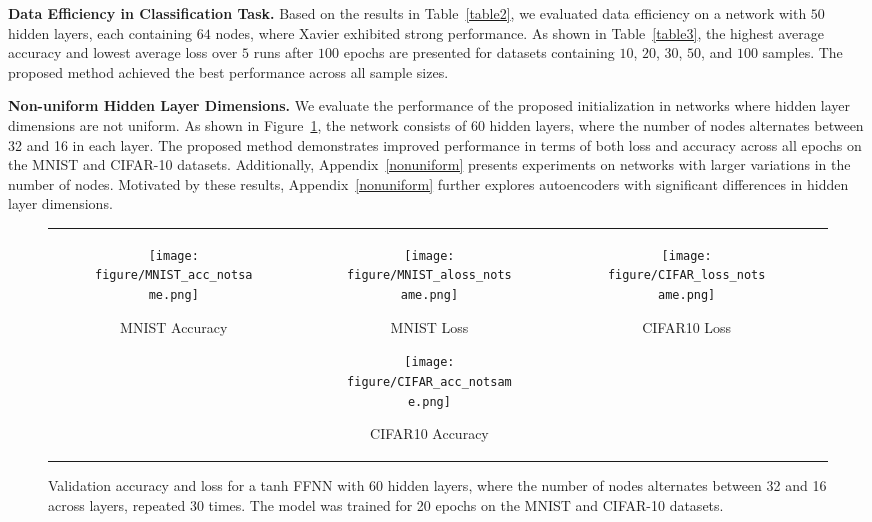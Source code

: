 \documentclass{article} \usepackage{iclr2025_conference,times}
\begin{document}
\textbf{Data Efficiency in Classification Task.} 
Based on the results in Table~\ref{table2}, we evaluated data efficiency on a network with $50$ hidden layers, each containing $64$ nodes, where Xavier exhibited strong performance. 
As shown in Table~\ref{table3}, the highest average accuracy and lowest average loss over $5$ runs after $100$ epochs are presented for datasets containing $10$, $20$, $30$, $50$, and $100$ samples. The proposed method achieved the best performance across all sample sizes.

\textbf{Non-uniform Hidden Layer Dimensions.} We evaluate the performance of the proposed initialization in networks where hidden layer dimensions are not uniform. As shown in Figure~\ref{fig:mnist_cifar}, the network consists of 60 hidden layers, where the number of nodes alternates between 32 and 16 in each layer. The proposed method demonstrates improved performance in terms of both loss and accuracy across all epochs on the MNIST and CIFAR-10 datasets. Additionally, Appendix~\ref{nonuniform} presents experiments on networks with larger variations in the number of nodes. Motivated by these results, Appendix~\ref{nonuniform} further explores autoencoders with significant differences in hidden layer dimensions.


\begin{figure}[h]
\centering 
\begin{tabular}{cccc}
\begin{subfigure}[b]{0.23\textwidth}
    \centering
    \texttt{[image: figure/MNIST\_acc\_notsame.png]}
    \caption{MNIST Accuracy}
\end{subfigure} &
\begin{subfigure}[b]{0.23\textwidth}
    \centering
    \texttt{[image: figure/MNIST\_aloss\_notsame.png]}
    \caption{MNIST Loss}
\end{subfigure} 
\begin{subfigure}[b]{0.23\textwidth}
    \centering
    \texttt{[image: figure/CIFAR\_acc\_notsame.png]}
    \caption{CIFAR10 Accuracy}
\end{subfigure} &
\begin{subfigure}[b]{0.23\textwidth}
    \centering
    \texttt{[image: figure/CIFAR\_loss\_notsame.png]}
    \caption{CIFAR10 Loss}
\end{subfigure} 
\end{tabular}
\caption{Validation accuracy and loss for a tanh FFNN with 60 hidden layers, where the number of nodes alternates between 32 and 16 across layers, repeated 30 times. The model was trained for 20 epochs on the MNIST and CIFAR-10 datasets.} 
\label{fig:mnist_cifar}
\end{figure}
\end{document}
